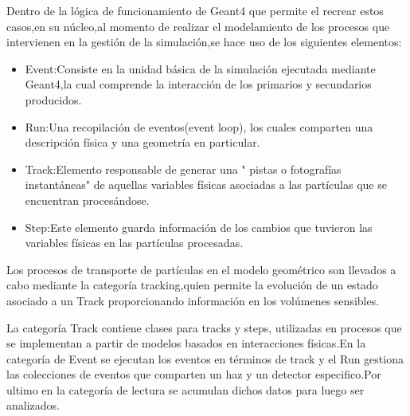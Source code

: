 \documentclass[12pt,fleqn]{book} %
\numberwithin{equation}{section} %
\numberwithin{figure}{section} %
\numberwithin{table}{section} %
\begin{document}
{Dentro de la lógica de funcionamiento de Geant4 que permite el recrear estos casos,en su núcleo,al momento de realizar el modelamiento de los procesos que  intervienen en la gestión de la simulación,se hace uso de los siguientes elementos:
\begin{itemize}
\item Event:Consiste en la unidad básica de la simulación ejecutada mediante Geant4,la cual comprende la interacción de los primarios y secundarios producidos.
 \item Run:Una recopilación de eventos(event loop), los cuales comparten una descripción física y una geometría en particular.  
 \item Track:Elemento responsable de generar una " pistas o fotografías instantáneas" de aquellas variables físicas asociadas a las partículas que se encuentran procesándose. 
 \item Step:Este elemento guarda información de los cambios que tuvieron las variables físicas en las partículas procesadas. 
\end{itemize}


Los procesos de transporte de partículas en el modelo geométrico son llevados a cabo mediante
la categoría tracking,quien permite la evolución de un estado asociado a un Track proporcionando información en los volúmenes sensibles.

La categoría Track contiene clases para tracks y steps, utilizadas en procesos que se implementan a partir de modelos basados en interacciones físicas.En la categoría de Event se ejecutan los eventos en términos de track y el Run gestiona las colecciones de eventos que comparten un haz y un detector especifico.Por ultimo en la categoría de lectura se acumulan dichos datos para luego ser analizados.




}
\end{document}

